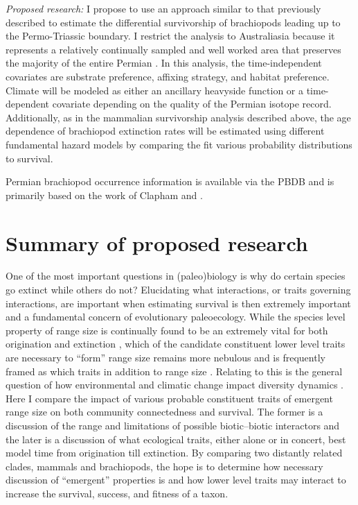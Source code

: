 \documentclass[12pt,letterpaper]{article}
\begin{document}
\textit{Proposed research:}
I propose to use an approach similar to that previously described to estimate the differential survivorship of brachiopods leading up to the Permo-Triassic boundary. I restrict the analysis to Australiasia because it represents a relatively continually sampled and well worked area that preserves the majority of the entire Permian \citep{Clapham2012,Clapham2008a,Waterhouse1987,Archbold1995}. In this analysis, the time-independent covariates are substrate preference, affixing strategy, and habitat preference. Climate will be modeled as either an ancillary heavyside function or a time-dependent covariate depending on the quality of the Permian isotope record. Additionally, as in the mammalian survivorship analysis described above, the age dependence of brachiopod extinction rates will be estimated using different fundamental hazard models by comparing the fit various probability distributions to survival.

Permian brachiopod occurrence information is available via the PBDB and is primarily based on the work of Clapham \citep{Clapham2006,Clapham2008a,Clapham2007a,Clapham2012,Clapham2007} and \citet{Waterhouse1987}.


\section{Summary of proposed research}
One of the most important questions in (paleo)biology is why do certain species go extinct while others do not? %
Elucidating what interactions, or traits governing interactions, are important when estimating survival is then extremely important and a fundamental concern of evolutionary paleoecology. While the species level property of range size is continually found to be an extremely vital for both origination and extinction \citep{Roy2009c,Foote2013,Jablonski2003,Jablonski1987,Harnik2013}, which of the candidate constituent lower level traits are necessary to ``form'' range size remains more nebulous and is frequently framed as which traits in addition to range size \citep{Foote2013,Harnik2011,Nurnberg2013a}. Relating to this is the general question of how environmental and climatic change impact diversity dynamics \citep{Barnosky2001a,Alroy2000g,Figueirido2012,Olszewski2004}.
Here I compare the impact of various probable constituent traits of emergent range size on both community connectedness and survival. The former is a discussion of the range and limitations of possible biotic--biotic interactors and the later is a discussion of what ecological traits, either alone or in concert, best model time from origination till extinction. By comparing two distantly related clades, mammals and brachiopods, the hope is to determine how necessary discussion of ``emergent'' properties is and how lower level traits may interact to increase the survival, success, and fitness of a taxon.
\end{document}

